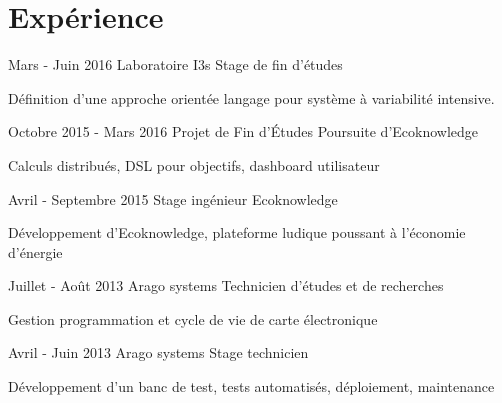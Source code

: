 \section{Exp\'erience}

\begin{eventlist}

\item{Mars - Juin 2016}
     {Laboratoire I3s}
     {Stage de fin d'\'etudes}

	D\'efinition d'une approche orient\'ee langage pour syst\`eme \`a variabilit\'e intensive.

\item{Octobre 2015 - Mars 2016}
     {Projet de Fin d'\'Etudes}
     {Poursuite d'Ecoknowledge}

Calculs distribu\'es, DSL pour objectifs, dashboard utilisateur

\item{Avril - Septembre 2015}
     {Stage ing\'enieur}
     {Ecoknowledge}
     
     D\'eveloppement d'Ecoknowledge, plateforme ludique poussant \`a l'\'economie d'\'energie

\item{Juillet - Ao\^ut 2013}
     {Arago systems}
     {Technicien d'\'etudes et de recherches}
     
     Gestion programmation et cycle de vie de carte \'electronique
     
 \item{Avril - Juin 2013}
     {Arago systems}
     {Stage technicien}
     
     D\'eveloppement d'un banc de test, tests automatis\'es, d\'eploiement, maintenance
     
\end{eventlist}